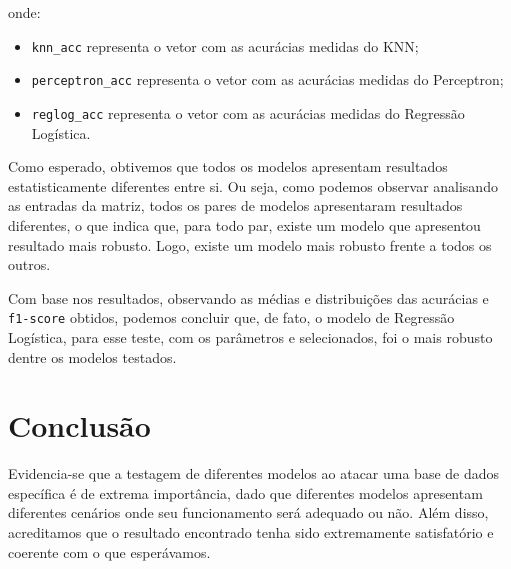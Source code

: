   onde:

  \begin{itemize}
  \item \texttt{knn\_acc} representa o vetor com as acurácias medidas do KNN;
  \item \texttt{perceptron\_acc} representa o vetor com as acurácias medidas do Perceptron;
  \item \texttt{reglog\_acc} representa o vetor com as acurácias medidas do Regressão Logística.
  \end{itemize}

  Como esperado, obtivemos que todos os modelos apresentam resultados estatisticamente diferentes entre si. Ou seja, como podemos observar analisando as entradas da matriz, todos os pares de modelos apresentaram resultados diferentes, o que indica que, para todo par, existe um modelo que apresentou resultado mais robusto. Logo, existe um modelo mais robusto frente a todos os outros.

  Com base nos resultados, observando as médias e distribuições das acurácias e \texttt{f1-score} obtidos, podemos concluir que, de fato, o modelo de Regressão Logística, para esse teste, com os parâmetros e  selecionados, foi o mais robusto dentre os modelos testados.


\section{Conclusão}

  Evidencia-se que a testagem de diferentes modelos ao atacar uma base de dados específica é de extrema importância, dado que diferentes modelos apresentam diferentes cenários onde seu funcionamento será adequado ou não. Além disso, acreditamos que o resultado encontrado tenha sido extremamente satisfatório e coerente com o que esperávamos.
